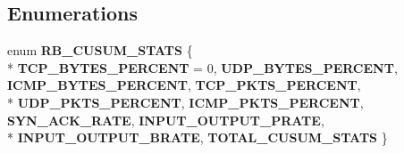 \subsection*{Enumerations}
\begin{DoxyCompactItemize}
\item 
enum {\bf R\+B\+\_\+\+C\+U\+S\+U\+M\+\_\+\+S\+T\+A\+T\+S} \{ \\*
{\bf T\+C\+P\+\_\+\+B\+Y\+T\+E\+S\+\_\+\+P\+E\+R\+C\+E\+N\+T} = 0, 
{\bf U\+D\+P\+\_\+\+B\+Y\+T\+E\+S\+\_\+\+P\+E\+R\+C\+E\+N\+T}, 
{\bf I\+C\+M\+P\+\_\+\+B\+Y\+T\+E\+S\+\_\+\+P\+E\+R\+C\+E\+N\+T}, 
{\bf T\+C\+P\+\_\+\+P\+K\+T\+S\+\_\+\+P\+E\+R\+C\+E\+N\+T}, 
\\*
{\bf U\+D\+P\+\_\+\+P\+K\+T\+S\+\_\+\+P\+E\+R\+C\+E\+N\+T}, 
{\bf I\+C\+M\+P\+\_\+\+P\+K\+T\+S\+\_\+\+P\+E\+R\+C\+E\+N\+T}, 
{\bf S\+Y\+N\+\_\+\+A\+C\+K\+\_\+\+R\+A\+T\+E}, 
{\bf I\+N\+P\+U\+T\+\_\+\+O\+U\+T\+P\+U\+T\+\_\+\+P\+R\+A\+T\+E}, 
\\*
{\bf I\+N\+P\+U\+T\+\_\+\+O\+U\+T\+P\+U\+T\+\_\+\+B\+R\+A\+T\+E}, 
{\bf T\+O\+T\+A\+L\+\_\+\+C\+U\+S\+U\+M\+\_\+\+S\+T\+A\+T\+S}
 \}
\end{DoxyCompactItemize}
